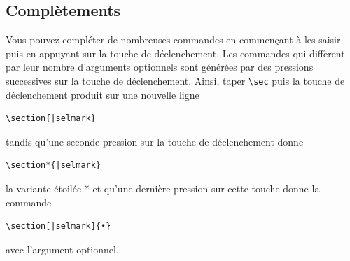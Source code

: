 \documentclass[11pt,french]{article}
\newcommand{\TS}{\textsf{\TeX Shop}}
\newcommand{\cmd}[1]{\textsf{#1}}
\newcommand{\mnu}[1]{\textsf{#1}}
\newcommand{\To}{\,\(\to\)\,}
\begin{document}

\subsection{Complètements}

Vous pouvez compléter de nombreuses commandes en commençant à les saisir puis en appuyant sur la touche de déclenchement. Les commandes qui diffèrent par leur nombre d'arguments optionnels sont générées par des pressions successives sur la touche de déclenchement. Ainsi, taper \verb|\sec| puis la touche de déclenchement produit sur une nouvelle ligne

\begin{verbatim}
\section{|selmark}
\end{verbatim}
tandis qu'une seconde pression sur la touche de déclenchement donne
\begin{verbatim}
\section*{|selmark}
\end{verbatim}
la variante étoilée * et qu'une dernière pression sur cette touche donne la commande
\begin{verbatim}
\section[|selmark]{•}
\end{verbatim}
avec l'argument optionnel.
\end{document}
